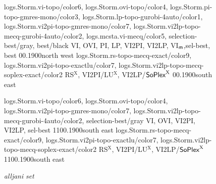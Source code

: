 
\begin{figure*}[!htp]
	\centering
	{
	logs.Storm.vi-topo/color6,
	logs.Storm.ovi-topo/color4,
	logs.Storm.pi-topo-gmres-mono/color3, %
	logs.Storm.lp-topo-gurobi-4auto/color1, %
	logs.Storm.vi2pi-topo-gmres-mono/color7,
	logs.Storm.vi2lp-topo-mecq-gurobi-4auto/color2,
	logs.mcsta.vi-mecq/color5,
	selection-best/gray,
	best/black
	}
	{VI, OVI, PI, LP, VI2PI, VI2LP, VI$_\textsf{m}$,sel-best, best}
	{0}{\numcommunity}{0.1}{900}{north west}
	{
	logs.Storm.rs-topo-mecq-exact/color9,
	logs.Storm.vi2pi-topo-exactlu/color7,
	logs.Storm.vi2lp-topo-mecq-soplex-exact/color2
	}
	{RS$^\mathrm{X}$, VI2PI/LU$^\mathrm{X}$, VI2LP/$\textsf{SoPlex}^\mathrm{X}$}
	{0}{\numcommunity}{0.1}{900}{south east}
	
	\comset \vspace{0.2cm}
	
%
	{
	logs.Storm.vi-topo/color6,
	logs.Storm.ovi-topo/color4,
	logs.Storm.vi2pi-topo-gmres-mono/color7,
	logs.Storm.vi2lp-topo-mecq-gurobi-4auto/color2,
	selection-best/gray
	}
	{VI, OVI, VI2PI, VI2LP, sel-best}
	{110}{\numalljani}{0.1}{900}{south east}
	{
	logs.Storm.rs-topo-mecq-exact/color9,
	logs.Storm.vi2pi-topo-exactlu/color7,
	logs.Storm.vi2lp-topo-mecq-soplex-exact/color2
	}
	{RS$^\mathrm{X}$,  VI2PI/LU$^\mathrm{X}$, VI2LP/$\textsf{SoPlex}^\mathrm{X}$}
	{110}{\numalljani}{0.1}{900}{south east}
	
	\textit{alljani set} \vspace{0.2cm}
	
%
%	
	

\end{figure*}
